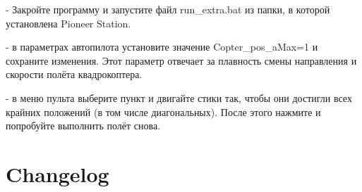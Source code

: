 \documentclass[a4paper,10pt,russian]{sphinxmanual}
\begin{document}
 - Закройте программу и запустите файл run\_extra.bat из папки, в которой установлена Pioneer Station.

 - в параметрах автопилота установите значение Copter\_pos\_aMax=1 и сохраните изменения. Этот параметр отвечает за плавность смены направления и скорости полёта квадрокоптера.

 - в меню пульта  выберите пункт  и двигайте стики так, чтобы они достигли всех крайних положений (в том числе диагональных). После этого нажмите  и попробуйте выполнить полёт снова.


\chapter{Changelog}
\label{\detokenize{changelog:changelog}}\label{\detokenize{changelog::doc}}
\end{document}
